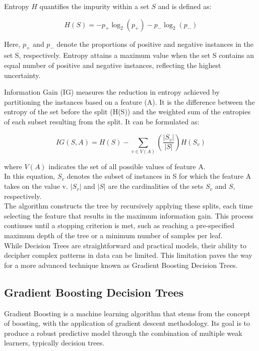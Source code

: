 Entropy $H$ quantifies the impurity within a set $S$ and is defined as:

\begin{equation}
	H(S) = - p_{+} \log_{2}(p_{+}) - p_{-} \log_{2}(p_{-})
\end{equation}

Here, $p_+$ and $p_-$ denote the proportions of positive and negative instances in the set S, respectively. Entropy attains a maximum value when the set S contains an equal number of positive and negative instances, reflecting the highest uncertainty.

Information Gain (IG) measures the reduction in entropy achieved by partitioning the instances based on a feature (A). It is the difference between the entropy of the set before the split (H(S)) and the weighted sum of the entropies of each subset resulting from the split. It can be formulated as:

\begin{equation}
	IG(S, A) = H(S) - \sum_{v \in V(A)} \left(\frac{|S_v|}{|S|}\right) H(S_v)
\end{equation}

where $V(A)$ indicates the set of all possible values of feature A.\\
In this equation, $S_v$ denotes the subset of instances in S for which the feature A takes on the value v. $|S_v|$ and $|S|$ are the cardinalities of the sets $S_v$ and $S$, respectively.\\

The algorithm constructs the tree by recursively applying these splits, each time selecting the feature that results in the maximum information gain. This process continues until a stopping criterion is met, such as reaching a pre-specified maximum depth of the tree or a minimum number of samples per leaf.\\


While Decision Trees are straightforward and practical models, their ability to decipher complex patterns in data can be limited. This limitation paves the way for a more advanced technique known as Gradient Boosting Decision Trees. 

\subsection{Gradient Boosting Decision Trees}

Gradient Boosting is a machine learning algorithm that stems from the concept of boosting, with the application of gradient descent methodology. Its goal is to produce a robust predictive model through the combination of multiple weak learners, typically decision trees.


